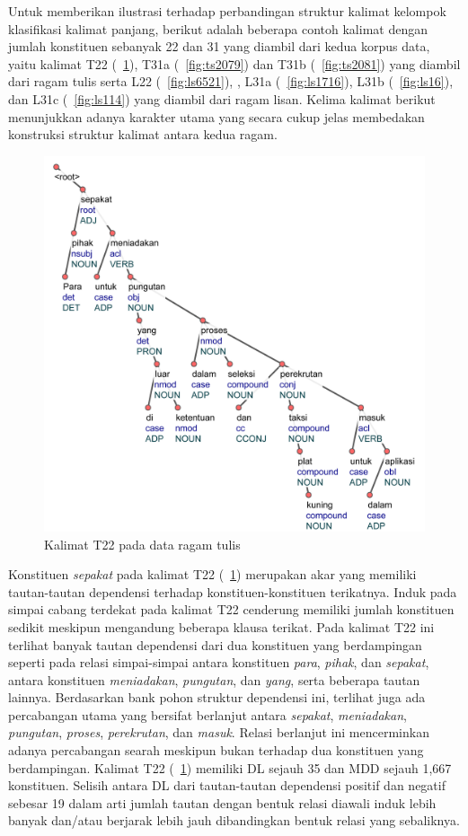 Untuk memberikan ilustrasi terhadap perbandingan struktur kalimat kelompok klasifikasi kalimat panjang, berikut adalah beberapa contoh kalimat dengan jumlah konstituen sebanyak 22 dan 31 yang diambil dari kedua korpus data, yaitu kalimat T22 (\pic~\ref{fig:ts3901}), T31a (\pic~\ref{fig:ts2079}) dan T31b (\pic~\ref{fig:ts2081}) yang diambil dari ragam tulis serta L22 (\pic~\ref{fig:ls6521}), , L31a (\pic~\ref{fig:ls1716}), L31b (\pic~\ref{fig:ls16}), dan L31c (\pic~\ref{fig:ls114}) yang diambil dari ragam lisan. Kelima kalimat berikut menunjukkan adanya karakter utama yang secara cukup jelas membedakan konstruksi struktur kalimat antara kedua ragam. 

\begin{figure}
	\centering \includegraphics[width=0.8
	\textwidth] {pics/ts3901.jpg} 
	\caption{Kalimat T22 pada data ragam tulis} 
	\label{fig:ts3901} 
\end{figure}

Konstituen \textit{sepakat} pada kalimat T22 (\pic~\ref{fig:ts3901}) merupakan akar yang memiliki tautan-tautan dependensi terhadap konstituen-konstituen terikatnya. Induk pada simpai cabang terdekat pada kalimat T22 cenderung memiliki jumlah konstituen sedikit meskipun mengandung beberapa klausa terikat. Pada kalimat T22 ini terlihat banyak tautan dependensi dari dua konstituen yang berdampingan seperti pada relasi simpai-simpai antara konstituen \textit{para}, \textit{pihak}, dan \textit{sepakat}, antara konstituen \textit{meniadakan}, \textit{pungutan}, dan \textit{yang}, serta beberapa tautan lainnya. Berdasarkan bank pohon struktur dependensi ini, terlihat juga ada percabangan utama yang bersifat berlanjut antara \textit{sepakat}, \textit{meniadakan}, \textit{pungutan}, \textit{proses}, \textit{perekrutan}, dan \textit{masuk}. Relasi berlanjut ini mencerminkan adanya percabangan searah meskipun bukan terhadap dua konstituen yang berdampingan. Kalimat T22 (\pic~\ref{fig:ts3901}) memiliki DL sejauh 35 dan MDD sejauh 1,667 konstituen. Selisih antara DL dari tautan-tautan dependensi positif dan negatif sebesar 19 dalam arti jumlah tautan dengan bentuk relasi diawali induk lebih banyak dan/atau berjarak lebih jauh dibandingkan bentuk relasi yang sebaliknya.


